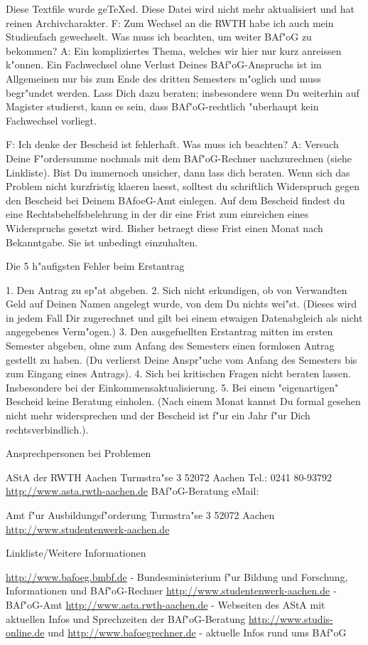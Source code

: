 \begin{artikel}{Diese Textfile wurde geTeXed. Diese Datei wird nicht mehr aktualisiert und hat reinen Archivcharakter. }
F: Zum Wechsel an die RWTH habe ich auch mein Studienfach gewechselt. Was muss ich beachten, um weiter BAf"oG zu bekommen?
A: Ein kompliziertes Thema, welches wir hier nur kurz anreissen k"onnen. Ein Fachwechsel ohne Verlust Deines BAf"oG-Anspruchs ist im Allgemeinen nur bis zum Ende des dritten Semesters m"oglich und muss begr"undet werden. Lass Dich dazu beraten; insbesondere wenn Du weiterhin auf Magister studierst, kann es sein, dass BAf"oG-rechtlich "uberhaupt kein Fachwechsel vorliegt.

F: Ich denke der Bescheid ist fehlerhaft. Was muss ich beachten?
A: Versuch Deine F"ordersumme nochmals mit dem BAf"oG-Rechner nachzurechnen (siehe Linkliste). Bist Du immernoch unsicher, dann lass dich beraten. Wenn sich das Problem nicht kurzfristig klaeren laesst, solltest du schriftlich Widerspruch gegen den Bescheid bei Deinem BAfoeG-Amt einlegen. Auf dem Bescheid findest du eine Rechtsbehelfsbelehrung in der dir eine Frist zum einreichen eines Widerspruchs gesetzt wird. Bisher betraegt diese Frist einen Monat nach Bekanntgabe. Sie ist unbedingt einzuhalten.

Die 5 h"aufigsten Fehler beim Erstantrag

1. Den Antrag zu sp"at abgeben.
2. Sich nicht erkundigen, ob von Verwandten Geld auf Deinen Namen angelegt wurde, von dem Du nichts wei"st. (Dieses wird in jedem Fall Dir zugerechnet und gilt bei einem etwaigen Datenabgleich als nicht angegebenes Verm"ogen.)
3. Den ausgefuellten Erstantrag mitten im ersten Semester abgeben, ohne zum Anfang des Semesters einen formlosen Antrag gestellt zu haben. (Du verlierst Deine Anspr"uche vom Anfang des Semesters bis zum Eingang eines Antrags).
4. Sich bei kritischen Fragen nicht beraten lassen. Insbesondere bei der Einkommensaktualisierung.
5. Bei einem "eigenartigen" Bescheid keine Beratung einholen. (Nach einem Monat kannst Du formal gesehen nicht mehr widersprechen und der Bescheid ist f"ur ein Jahr f"ur Dich rechtsverbindlich.). 

Ansprechpersonen bei Problemen

AStA der RWTH Aachen
Turmstra"se 3
52072 Aachen
Tel.: 0241 80-93792
\url{http://www.asta.rwth-aachen.de}
BAf"oG-Beratung eMail: 

Amt f"ur Ausbildungsf"orderung
Turmstra"se 3
52072 Aachen
\url{http://www.studentenwerk-aachen.de}

Linkliste/Weitere Informationen

\url{http://www.bafoeg.bmbf.de} - Bundesministerium f"ur Bildung und Forschung, Informationen und BAf"oG-Rechner
\url{http://www.studentenwerk-aachen.de} - BAf"oG-Amt
\url{http://www.asta.rwth-aachen.de} - Webseiten des AStA mit aktuellen Infos und Sprechzeiten der BAf"oG-Beratung
\url{http://www.studis-online.de} und \url{http://www.bafoegrechner.de} - aktuelle Infos rund ums BAf"oG

\end{artikel}
